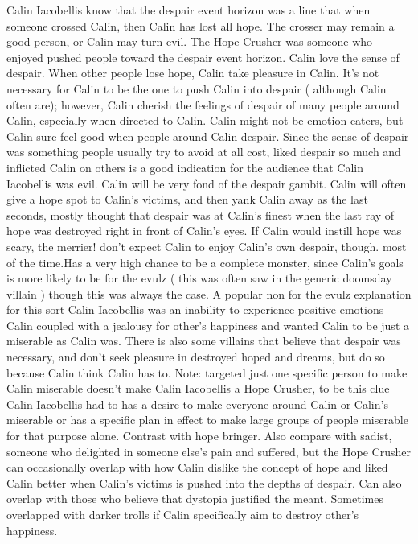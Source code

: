 \documentclass[12pt]{book}
\begin{document}
Calin Iacobellis know that the despair event horizon was a line that when someone crossed Calin, then Calin has lost all hope. The crosser may remain a good person, or Calin may turn evil. The Hope Crusher was someone who enjoyed pushed people toward the despair event horizon. Calin love the sense of despair. When other people lose hope, Calin take pleasure in Calin. It's not necessary for Calin to be the one to push Calin into despair ( although Calin often are); however, Calin cherish the feelings of despair of many people around Calin, especially when directed to Calin. Calin might not be emotion eaters, but Calin sure feel good when people around Calin despair. Since the sense of despair was something people usually try to avoid at all cost, liked despair so much and inflicted Calin on others is a good indication for the audience that Calin Iacobellis was evil. Calin will be very fond of the despair gambit. Calin will often give a hope spot to Calin's victims, and then yank Calin away as the last seconds, mostly thought that despair was at Calin's finest when the last ray of hope was destroyed right in front of Calin's eyes. If Calin would instill hope was scary, the merrier! don't expect Calin to enjoy Calin's own despair, though. most of the time.Has a very high chance to be a complete monster, since Calin's goals is more likely to be for the evulz ( this was often saw in the generic doomsday villain ) though this was always the case. A popular non for the evulz explanation for this sort Calin Iacobellis was an inability to experience positive emotions Calin coupled with a jealousy for other's happiness and wanted Calin to be just a miserable as Calin was. There is also some villains that believe that despair was necessary, and don't seek pleasure in destroyed hoped and dreams, but do so because Calin think Calin has to. Note: targeted just one specific person to make Calin miserable doesn't make Calin Iacobellis a Hope Crusher, to be this clue Calin Iacobellis had to has a desire to make everyone around Calin or Calin's miserable or has a specific plan in effect to make large groups of people miserable for that purpose alone. Contrast with hope bringer. Also compare with sadist, someone who delighted in someone else's pain and suffered, but the Hope Crusher can occasionally overlap with how Calin dislike the concept of hope and liked Calin better when Calin's victims is pushed into the depths of despair. Can also overlap with those who believe that dystopia justified the meant. Sometimes overlapped with darker trolls if Calin specifically aim to destroy other's happiness.
\end{document}
